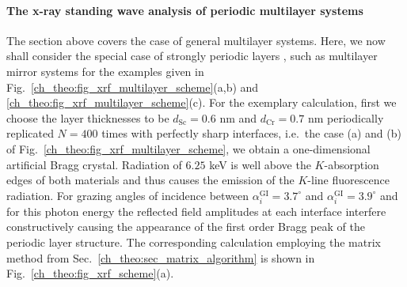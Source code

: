 \paragraph{The x-ray standing wave analysis of periodic multilayer systems}
The section above covers the case of general multilayer systems. Here, we now shall consider the special case of strongly periodic layers \cite{dev_resonance_2000, ghose_x-ray_2001}, such as multilayer mirror systems for the examples given in Fig.~\ref{ch_theo:fig_xrf_multilayer_scheme}(a,b) and \ref{ch_theo:fig_xrf_multilayer_scheme}(c). For the exemplary calculation, first we choose the layer thicknesses to be $d_\text{Sc} = 0.6$ nm and $d_\text{Cr} = 0.7$ nm periodically replicated $N=400$ times with perfectly sharp interfaces, i.e.~the case (a) and (b) of Fig.~\ref{ch_theo:fig_xrf_multilayer_scheme}, we obtain a one-dimensional artificial Bragg crystal. Radiation of $6.25$ keV is well above the $K$-absorption edges of both materials and thus causes the emission of the $K$-line fluorescence radiation. For grazing angles of incidence between $\alpha_i^\text{GI} = 3.7^\circ$ and $\alpha_i^\text{GI}=3.9^\circ$ and for this photon energy the reflected field amplitudes at each interface interfere constructively causing the appearance of the first order Bragg peak of the periodic layer structure. The corresponding calculation employing the matrix method from Sec.~\ref{ch_theo:sec_matrix_algorithm} is shown in Fig.~\ref{ch_theo:fig_xrf_scheme}(a).
